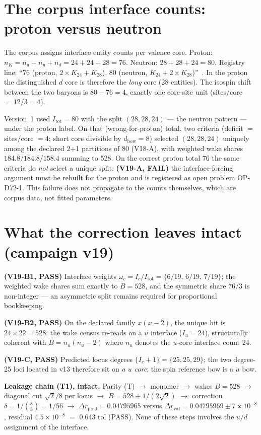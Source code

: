 \documentclass[11pt,a4paper]{article}
\begin{document}
\section{The corpus interface counts: proton versus neutron}
The corpus assigns interface entity counts per valence core. Proton: $n_K = n_u + n_u + n_d = 24 + 24 + 28 = 76$. Neutron: $28 + 28 + 24 = 80$. Registry line: ``76 (proton, $2\times K_{24} + K_{28}$), 80 (neutron, $K_{24} + 2\times K_{28}$)''~\cite{pdlcontext}. In the proton the distinguished $d$ core is therefore the \emph{long} core (28 entities). The isospin shift between the two baryons is $80 - 76 = 4$, exactly one core-site unit (sites/core $= 12/3 = 4$).

Version~1 used $I_{\mathrm{tot}} = 80$ with the split $(28,28,24)$ --- the neutron pattern --- under the proton label. On that (wrong-for-proton) total, two criteria (deficit $=$ sites/core $=4$; short core divisible by $d_{\mathrm{bow}}=8$) selected $(28,28,24)$ uniquely among the declared 2+1 partitions of 80 (V18-A), with weighted wake shares $184.8/184.8/158.4$ summing to 528. On the correct proton total 76 the same criteria do \emph{not} select a unique split: \textbf{(V19-A, FAIL)} the interface-forcing argument must be rebuilt for the proton and is registered as open problem OP-D72-1. This failure does not propagate to the counts themselves, which are corpus data, not fitted parameters.

\section{What the correction leaves intact (campaign v19)}
\textbf{(V19-B1, PASS)} Interface weights $\omega_c = I_c/I_{\mathrm{tot}} = \{6/19,\, 6/19,\, 7/19\}$; the weighted wake shares sum exactly to $B = 528$, and the symmetric share $76/3$ is non-integer --- an asymmetric split remains required for proportional bookkeeping.

\textbf{(V19-B2, PASS)} On the declared family $x(x-2)$, the unique hit is $24 \times 22 = 528$: the wake census re-reads on a $u$ interface ($I_u = 24$), structurally coherent with $B = n_u(n_u-2)$ where $n_u$ denotes the $u$-core interface count 24.

\textbf{(V19-C, PASS)} Predicted locus degrees $\{I_c + 1\} = \{25, 25, 29\}$; the two degree-25 loci located in v13 therefore sit on \emph{a $u$ core}; the spin reference bow is a $u$ bow.

\textbf{Leakage chain (T1), intact.} Parity (T) $\to$ monomer $\to$ wakes $B = 528$ $\to$ diagonal cut $\sqrt{2}/8$ per locus $\to$ $B = 528 + 1/(2\sqrt{2})$ $\to$ correction $\delta = 1/\binom{8}{3} = 1/56$ $\to$ $\Delta r_{\mathrm{pred}} = 0.04795965$ versus $\Delta r_{\mathrm{val}} = 0.04795969 \pm 7 \times 10^{-8}$, residual $4.5 \times 10^{-8}$ $=$ 0.643 tol (PASS). None of these steps involves the $u/d$ assignment of the interface.
\end{document}
